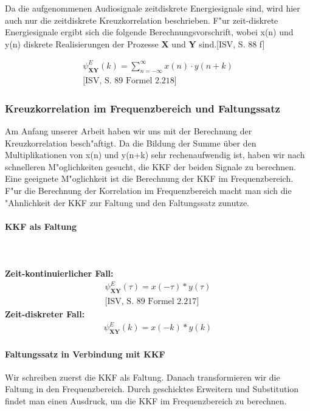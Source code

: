 \noindent Da die aufgenommenen Audiosignale zeitdiskrete Energiesignale sind, wird hier auch nur die zeitdiskrete Kreuzkorrelation beschrieben. F"ur zeit-diskrete Energiesignale ergibt sich die folgende Berechnungsvorschrift, wobei x(n) und y(n) diskrete Realisierungen der Prozesse \textbf{X} und \textbf{Y} sind.[ISV, S. 88 f]

\begin{align}
\boxed{\psi_{\textbf {XY}}^E(k) = \sum_{n = -\infty}^{\infty} x(n) \cdot y(n+k)}\\\text{[ISV, S. 89 Formel 2.218]}
\end{align}

\subsubsection{Kreuzkorrelation im Frequenzbereich und Faltungssatz}
Am Anfang unserer Arbeit haben wir uns mit der Berechnung der Kreuzkorrelation besch"aftigt. Da die Bildung der Summe über den Multiplikationen von x(n) und y(n+k) sehr rechenaufwendig ist, haben wir nach schnelleren M"oglichkeiten gesucht, die KKF der beiden Signale zu berechnen. Eine geeignete M"oglichkeit ist die Berechnung der KKF im Frequenzbereich. F"ur die Berechnung der Korrelation im Frequenzbereich macht man sich die "Ahnlichkeit der KKF zur Faltung und den Faltungssatz zunutze.

\paragraph{KKF als Faltung}\textbf{\\\\Zeit-kontinuierlicher Fall:}
\begin{align}
\psi_{\textbf {XY}}^E(\tau) = x(-\tau) * y(\tau)\\\text{[ISV, S. 89 Formel 2.217]}
\end{align}
\textbf{Zeit-diskreter Fall:}
\begin{align}
\psi_{\textbf {XY}}^E(k) = x(-k) * y(k)
\end{align}
\paragraph{Faltungssatz in Verbindung mit KKF}Wir schreiben zuerst die KKF als Faltung. Danach transformieren wir die Faltung in den Frequenzbereich. Durch geschicktes Erweitern und Substitution findet man einen Ausdruck, um die KKF im Frequenzbereich zu berechnen.

